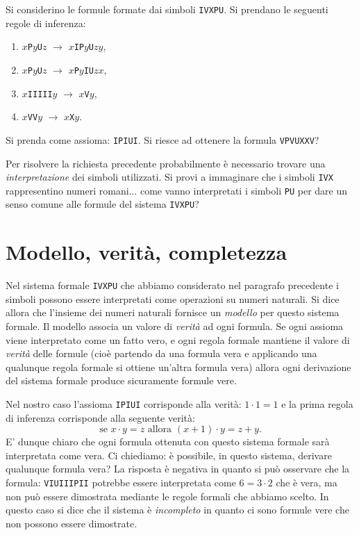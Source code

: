 \documentclass[italian,a4paper,hidelinks,headinclude]{scrartcl}
\newcommand{\myemph}[1]{\emph{#1}\marginpar{#1}}
\begin{document}
\begin{example}
Si  considerino le formule formate dai simboli
\texttt{IVXPU}.
Si prendano le seguenti regole di inferenza:
  \begin{enumerate}
  \item $x$\texttt{P}$y$\texttt{U}$z$ $\to$ $x$\texttt{IP}$y$\texttt{U}$zy$,
  \item $x$\texttt{P}$y$\texttt{U}$z$ $\to$ $x$\texttt{P}$y$\texttt{IU}$zx$,
  \item $x$\texttt{IIIII}$y$ $\to$ $x$\texttt{V}$y$,
  \item $x$\texttt{VV}$y$ $\to$ $x$\texttt{X}$y$.
  \end{enumerate}
  Si prenda come assioma: \texttt{IPIUI}. Si riesce ad ottenere la formula \texttt{VPVUXXV}?
\end{example}

Per risolvere la richiesta precedente probabilmente è
necessario trovare una \emph{interpretazione} dei simboli
utilizzati. Si provi a immaginare che i simboli \texttt{IVX}
rappresentino numeri romani... come vanno interpretati i simboli
\texttt{PU} per dare un senso comune alle formule del sistema
\texttt{IVXPU}?

\section{Modello, verità, completezza}

Nel sistema formale \texttt{IVXPU}
che abbiamo considerato nel paragrafo precedente i simboli possono essere interpretati
come operazioni su numeri naturali. Si dice allora che l'insieme dei
numeri naturali fornisce un \myemph{modello} per questo sistema
formale. Il modello associa un valore di \myemph{verità} ad ogni formula.
Se ogni assioma viene interpretato come un fatto vero, e ogni regola
formale mantiene il valore di \emph{verità} delle formule (cioè
partendo da una formula vera e applicando una qualunque regola formale
si ottiene un'altra formula vera) allora ogni derivazione del sistema
formale produce sicuramente formule vere.

Nel nostro caso l'assioma \texttt{IPIUI} corrisponde alla verità:
$1\cdot 1 = 1$ e
la prima regola di inferenza corrisponde alla seguente verità:
\[
\text{se $x\cdot y = z$ allora $(x+1)\cdot y = z + y$.}
\]
E' dunque chiaro che ogni formula ottenuta con questo sistema formale
sarà interpretata come vera. Ci chiediamo: è possibile, in questo
sistema, derivare qualunque formula vera? La risposta è negativa
in quanto si può osservare che la formula: \texttt{VIUIIIPII} potrebbe
essere interpretata come $6 = 3\cdot 2$ che è vera, ma non può essere
dimostrata mediante le regole formali che abbiamo scelto.
In questo caso si dice che il sistema è \myemph{incompleto} in quanto ci sono
formule vere che non possono essere dimostrate.
\end{document}
